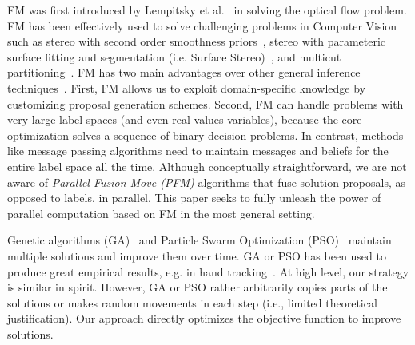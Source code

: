 
\noindent FM was first introduced by Lempitsky et al.~\cite{fusion_flow} in solving the
optical flow problem. FM has been effectively used to solve challenging
problems in Computer Vision such as stereo with second order smoothness
priors~\cite{second_order_stereo}, stereo with parameteric surface fitting and
segmentation (i.e. Surface Stereo)~\cite{surface_stereo}, and multicut
partitioning~\cite{fusion_moves_for_correlation_clustering}.
%
FM has two main advantages over other general inference
techniques~\cite{TRW-S,loopy_belief_propagation}. First, FM allows us to
exploit domain-specific knowledge by customizing proposal generation
schemes. Second, FM can handle problems with very large label spaces
(and even real-values variables), because the core optimization
solves a sequence of binary decision problems.
%
In contrast, methods like message passing algorithms need to maintain
messages and beliefs for the entire label space all the time.
%
Although conceptually straightforward, we are not aware of {\it Parallel
  Fusion Move (PFM)} algorithms that fuse solution proposals, as opposed to
labels, in parallel. This paper seeks to fully unleash the power of
parallel computation based on FM in the most general setting.



\noindent
Genetic algorithms (GA)~\cite{ga} and Particle Swarm
Optimization (PSO)~\cite{pso} maintain multiple solutions and improve
them over time.
%
GA or PSO has been used to produce great empirical results,
e.g. in hand tracking~\cite{pushmeet_hand_tracking}.
%
At high level, our strategy is similar in spirit. However, GA or PSO
rather arbitrarily copies parts of the solutions or makes random movements
in each step (i.e., limited theoretical justification).
%
Our approach directly optimizes the objective function to improve
solutions.



